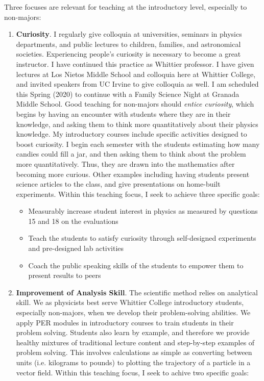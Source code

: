 \documentclass[../../main.tex]{subfiles}
\begin{document}
Three focuses are relevant for teaching at the introductory level, especially to non-majors:
\begin{enumerate}
\item \textbf{Curiosity}.  I regularly give colloquia at universities, seminars in physics departments, and public lectures to children, families, and astronomical societies.  Experiencing people's curiosity is necessary to become a great instructor.  I have continued this practice as Whittier professor.  I have given lectures at Los Nietos Middle School and colloquia here at Whittier College, and invited speakers from UC Irvine to give colloquia as well.  I am scheduled this Spring (2020) to continue with a Family Science Night at Granada Middle School.  Good teaching for non-majors should \textit{entice curiosity}, which begins by having an encounter with students where they are in their knowledge, and asking them to think more quantitatively about their physics knowledge.  My introductory courses include specific activities designed to boost curiosity.  I begin each semester with the students estimating how many candies could fill a jar, and then asking them to think about the problem more quantitatively.  Thus, they are drawn into the mathematics after becoming more curious.  Other examples including having students present science articles to the class, and give presentations on home-built experiments.  Within this teaching focus, I seek to achieve three specific goals:

\begin{itemize}
\item Measurably increase student interest in physics as measured by questions 15 and 18 on the evaluations
\item Teach the students to satisfy curiosity through self-designed experiments and pre-designed lab activities %
\item Coach the public speaking skills of the students to empower them to present results to peers %
\end{itemize}

\item \textbf{Improvement of Analysis Skill}.  The scientific method relies on analytical skill.  We as physicists best serve Whittier College introductory students, especially non-majors, when we develop their problem-solving abilities.  We apply PER modules in introductory courses to train students in their problem solving.  Students also learn by example, and therefore we provide healthy mixtures of traditional lecture content and step-by-step examples of problem solving.  This involves calculations as simple as converting between units (i.e. kilograms to pounds) to plotting the trajectory of a particle in a vector field.  Within this teaching focus, I seek to achive two specific goals:


\end{enumerate}
\end{document}
